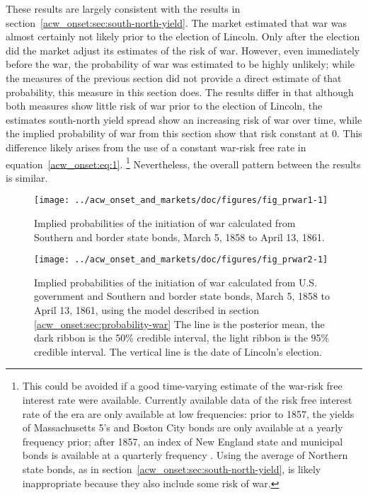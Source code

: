 These results are largely consistent with the results in section~\ref{acw_onset:sec:south-north-yield}.
The market estimated that war was almost certainly not likely prior to the election of Lincoln.
Only after the election did the market adjust its estimates of the risk of war.
However, even immediately before the war, the probability of war was estimated to be highly unlikely; while the measures of the previous section did not provide a direct estimate of that probability, this measure in this section does.
The results differ in that although both measures show little risk of war prior to the election of Lincoln, the estimates south-north yield spread show an increasing risk of war over time, while the implied probability of war from this section show that risk constant at 0.
This difference likely arises from the use of a constant war-risk free rate in equation~\eqref{acw_onset:eq:1}.%
\footnote{This could be avoided if a good time-varying estimate of the war-risk free interest rate were available.
  Currently available data of the risk free interest rate of the era are only available at low frequencies: prior to 1857, the yields of Massachusetts 5's and Boston City bonds are only available at a yearly frequency prior; after 1857, an index of New England state and municipal bonds is available at a quarterly frequency \parencite{Officer2003}.
  Using the average of Northern state bonds, as in section~\ref{acw_onset:sec:south-north-yield}, is likely inappropriate because they also include some risk of war.
}
Nevertheless, the overall pattern between the results is similar.

\begin{figure}
  \centering
  \texttt{[image: ../acw\_onset\_and\_markets/doc/figures/fig\_prwar1-1]}
  \caption[Implied probabilities of war initiation calculated for each from Southern and border state bonds]{Implied probabilities of the initiation of war calculated from Southern and border state bonds, March  5, 1858 to April 13, 1861.}
  \label{acw_onset:fig:prwar1}
\end{figure}

\begin{figure}
  \centering
  \texttt{[image: ../acw\_onset\_and\_markets/doc/figures/fig\_prwar2-1]}
  \caption[Implied probabilities of war initiation calculated from U.S. government, Southern and border state bonds]{
    Implied probabilities of the initiation of war calculated from U.S. government and Southern and border state bonds, March  5, 1858 to April 13, 1861, using the model described in section \ref{acw_onset:sec:probability-war}
    The line is the posterior mean, the dark ribbon is the 50\% credible interval, the light ribbon is the 95\% credible interval.
    The vertical line is the date of Lincoln's election.
  }
  \label{acw_onset:fig:prwar2}
\end{figure}

